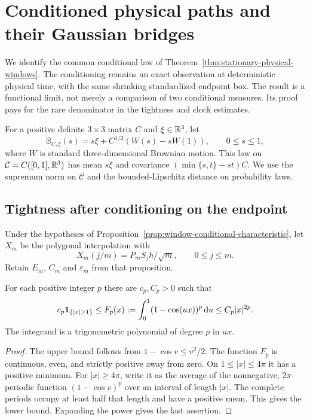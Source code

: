 \section{Conditioned physical paths and their Gaussian bridges}
\label{sec:stationary-window-bridges}
We identify the common conditional law of
Theorem~\ref{thm:stationary-physical-windows}. The conditioning remains
an exact observation at deterministic physical time, with the same
shrinking standardized endpoint box. The result is a functional limit,
not merely a comparison of two conditional measures. Its proof pays
for the rare denominator in the tightness and clock estimates.

For a positive definite $3\times3$ matrix $C$ and $\xi\in\mathbb R^3$, let
\begin{equation}\label{eq:Gaussian-bridge-definition}
 \mathbb B_{C,\xi}(s)=s\xi+C^{1/2}(W(s)-sW(1)),\qquad 0\le s\le1,
\end{equation}
where $W$ is standard three-dimensional Brownian motion. This law on
$\mathcal C=C([0,1],\mathbb R^3)$ has mean $s\xi$ and covariance
$(\min\{s,t\}-st)C$. We use the supremum norm on $\mathcal C$
and the bounded-Lipschitz distance on probability laws.

\subsection{Tightness after conditioning on the endpoint}
Under the hypotheses of
Proposition~\ref{prop:window-conditional-characteristic}, let $X_m$
be the polygonal interpolation with
\[
 X_m(j/m)=P_m S_jh/\sqrt m,\qquad 0\le j\le m.
\]
Retain $E_m$, $C_m$ and $\varepsilon_m$ from that proposition.

\begin{lemma}
\label{lem:bridge-trigonometric-tail}
For each positive integer $p$ there are $c_p,C_p>0$ such that
\[
 c_p\mathbf1_{\{|x|\ge1\}}
 \le F_p(x):=\int_0^1(1-\cos(ux))^p\,\mathrm d u
 \le C_p|x|^{2p}.
\]
The integrand is a trigonometric polynomial of degree $p$ in $ux$.
\end{lemma}
\begin{proof}
The upper bound follows from $1-\cos v\le v^2/2$.
The function $F_p$ is continuous, even, and strictly positive away
from zero. On $1\le|x|\le4\pi$ it has a positive minimum.
For $|x|\ge4\pi$, write it as the average of the nonnegative,
$2\pi$-periodic function $(1-\cos v)^p$ over an interval of length
$|x|$. The complete periods occupy at least half that length and
have a positive mean. This gives the lower bound. Expanding the
power gives the last assertion.
\end{proof}

